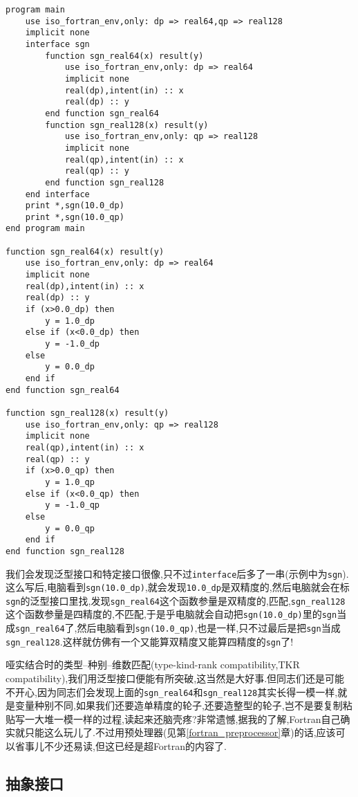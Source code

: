 \begin{lstlisting}
program main
    use iso_fortran_env,only: dp => real64,qp => real128
    implicit none
    interface sgn
        function sgn_real64(x) result(y)
            use iso_fortran_env,only: dp => real64
            implicit none
            real(dp),intent(in) :: x
            real(dp) :: y
        end function sgn_real64
        function sgn_real128(x) result(y)
            use iso_fortran_env,only: qp => real128
            implicit none
            real(qp),intent(in) :: x
            real(qp) :: y
        end function sgn_real128
    end interface
    print *,sgn(10.0_dp)
    print *,sgn(10.0_qp)
end program main

function sgn_real64(x) result(y)
    use iso_fortran_env,only: dp => real64
    implicit none
    real(dp),intent(in) :: x
    real(dp) :: y
    if (x>0.0_dp) then
        y = 1.0_dp
    else if (x<0.0_dp) then
        y = -1.0_dp
    else
        y = 0.0_dp
    end if
end function sgn_real64

function sgn_real128(x) result(y)
    use iso_fortran_env,only: qp => real128
    implicit none
    real(qp),intent(in) :: x
    real(qp) :: y
    if (x>0.0_qp) then
        y = 1.0_qp
    else if (x<0.0_qp) then
        y = -1.0_qp
    else
        y = 0.0_qp
    end if
end function sgn_real128
\end{lstlisting}
我们会发现泛型接口和特定接口很像,只不过\texttt{interface}后多了一串(示例中为\texttt{sgn}).这么写后,电脑看到\texttt{sgn(10.0\_{}dp)},就会发现\texttt{10.0\_{}dp}是双精度的,然后电脑就会在标\texttt{sgn}的泛型接口里找,发现\texttt{sgn\_{}real64}这个函数参量是双精度的,匹配,\texttt{sgn\_{}real128}这个函数参量是四精度的,不匹配,于是乎电脑就会自动把\texttt{sgn(10.0\_{}dp)}里的\texttt{sgn}当成\texttt{sgn\_{}real64}了,然后电脑看到\texttt{sgn(10.0\_{}qp)},也是一样,只不过最后是把\texttt{sgn}当成\texttt{sgn\_{}real128}.这样就仿佛有一个又能算双精度又能算四精度的\texttt{sgn}了!

哑实结合时的类型--种别--维数匹配(type-kind-rank compatibility,TKR compatibility),我们用泛型接口便能有所突破,这当然是大好事.但同志们还是可能不开心,因为同志们会发现上面的\texttt{sgn\_{}real64}和\texttt{sgn\_{}real128}其实长得一模一样,就是变量种别不同,如果我们还要造单精度的轮子,还要造整型的轮子,岂不是要复制粘贴写一大堆一模一样的过程,读起来还脑壳疼?非常遗憾,据我的了解,Fortran自己确实就只能这么玩儿了.不过用预处理器(见第\ref{fortran_preprocessor}章)的话,应该可以省事儿不少还易读,但这已经是超Fortran的内容了.

\subsection{抽象接口}

